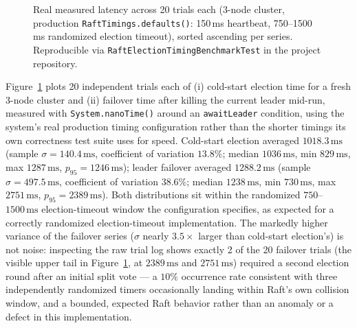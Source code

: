 \documentclass[conference]{IEEEtran}
\begin{document}
\begin{figure}[t]
\centering
{}
\caption{Real measured latency across 20 trials each (3-node cluster, production
\texttt{RaftTimings.defaults()}: 150\,ms heartbeat, 750--1500\,ms randomized election timeout),
sorted ascending per series. Reproducible via
\texttt{RaftElectionTimingBenchmarkTest} in the project repository.}
\label{fig:raft-timing}
\end{figure}

Figure~\ref{fig:raft-timing} plots 20 independent trials each of (i) cold-start election time for a
fresh 3-node cluster and (ii) failover time after killing the current leader mid-run, measured with
\texttt{System.nanoTime()} around an \texttt{awaitLeader} condition, using the system's real
production timing configuration rather than the shorter timings its own correctness test suite uses
for speed. Cold-start election averaged $1018.3\,\mathrm{ms}$ (sample $\sigma = 140.4\,\mathrm{ms}$,
coefficient of variation $13.8\%$; median $1036\,\mathrm{ms}$, min $829\,\mathrm{ms}$, max
$1287\,\mathrm{ms}$, $p_{95}=1246\,\mathrm{ms}$); leader failover averaged $1288.2\,\mathrm{ms}$
(sample $\sigma = 497.5\,\mathrm{ms}$, coefficient of variation $38.6\%$; median $1238\,\mathrm{ms}$,
min $730\,\mathrm{ms}$, max $2751\,\mathrm{ms}$, $p_{95}=2389\,\mathrm{ms}$). Both distributions sit
within the randomized $750$--$1500\,\mathrm{ms}$ election-timeout window the configuration specifies,
as expected for a correctly randomized election-timeout implementation. The markedly higher variance
of the failover series ($\sigma$ nearly $3.5\times$ larger than cold-start election's) is not noise:
inspecting the raw trial log shows exactly 2 of the 20 failover trials (the visible upper tail in
Figure~\ref{fig:raft-timing}, at $2389\,\mathrm{ms}$ and $2751\,\mathrm{ms}$) required a second
election round after an initial split vote — a $10\%$ occurrence rate consistent with three
independently randomized timers occasionally landing within Raft's own collision window, and a
bounded, expected Raft behavior rather than an anomaly or a defect in this implementation.
\end{document}

